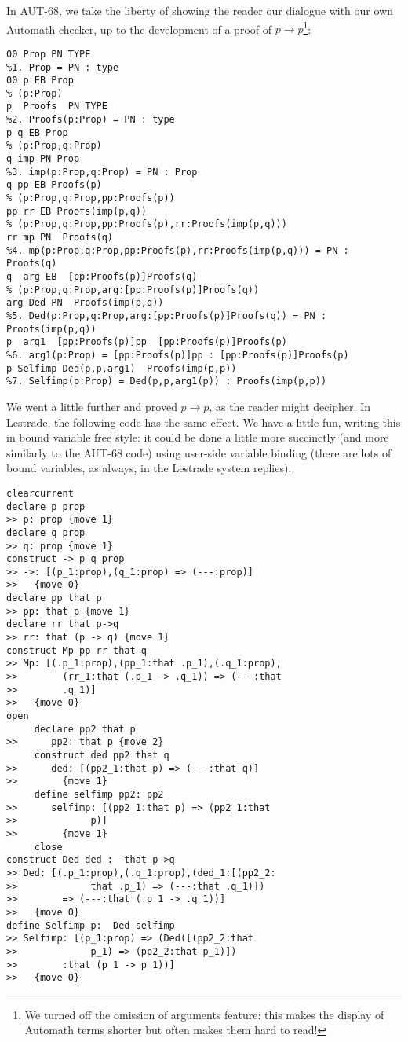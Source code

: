 \documentclass[submission,copyright,creativecommons]{eptcs}
\begin{document}
In AUT-68, we take the liberty of showing the reader our dialogue with our own Automath checker, up to the development of a proof of $p\rightarrow p$\footnote{We turned off the omission of arguments feature:  this makes the display of Automath terms shorter but often makes them hard to read!}:

   \begin{verbatim}
00 Prop PN TYPE
%1. Prop = PN : type
00 p EB Prop
% (p:Prop)
p  Proofs  PN TYPE
%2. Proofs(p:Prop) = PN : type
p q EB Prop
% (p:Prop,q:Prop)
q imp PN Prop
%3. imp(p:Prop,q:Prop) = PN : Prop
q pp EB Proofs(p)
% (p:Prop,q:Prop,pp:Proofs(p))
pp rr EB Proofs(imp(p,q))
% (p:Prop,q:Prop,pp:Proofs(p),rr:Proofs(imp(p,q)))
rr mp PN  Proofs(q)
%4. mp(p:Prop,q:Prop,pp:Proofs(p),rr:Proofs(imp(p,q))) = PN : Proofs(q)
q  arg EB  [pp:Proofs(p)]Proofs(q)
% (p:Prop,q:Prop,arg:[pp:Proofs(p)]Proofs(q))
arg Ded PN  Proofs(imp(p,q))
%5. Ded(p:Prop,q:Prop,arg:[pp:Proofs(p)]Proofs(q)) = PN : Proofs(imp(p,q))
p  arg1  [pp:Proofs(p)]pp  [pp:Proofs(p)]Proofs(p)
%6. arg1(p:Prop) = [pp:Proofs(p)]pp : [pp:Proofs(p)]Proofs(p)
p Selfimp Ded(p,p,arg1)  Proofs(imp(p,p))
%7. Selfimp(p:Prop) = Ded(p,p,arg1(p)) : Proofs(imp(p,p))
\end{verbatim}

We went a little further and proved $p \rightarrow p$, as the reader might decipher.  In Lestrade, the following code has the same effect.  We have a little fun, writing this in bound variable free style:  it could be done a little more succinctly (and more similarly to the AUT-68 code) using user-side variable binding (there are lots of bound variables, as always, in the Lestrade system replies).

\begin{verbatim}
clearcurrent
declare p prop
>> p: prop {move 1}
declare q prop
>> q: prop {move 1}
construct -> p q prop
>> ->: [(p_1:prop),(q_1:prop) => (---:prop)]
>>   {move 0}
declare pp that p
>> pp: that p {move 1}
declare rr that p->q
>> rr: that (p -> q) {move 1}
construct Mp pp rr that q
>> Mp: [(.p_1:prop),(pp_1:that .p_1),(.q_1:prop),
>>        (rr_1:that (.p_1 -> .q_1)) => (---:that 
>>        .q_1)]
>>   {move 0}
open
     declare pp2 that p
>>      pp2: that p {move 2}
     construct ded pp2 that q
>>      ded: [(pp2_1:that p) => (---:that q)]
>>        {move 1}
     define selfimp pp2: pp2
>>      selfimp: [(pp2_1:that p) => (pp2_1:that 
>>             p)]
>>        {move 1}
     close
construct Ded ded :  that p->q
>> Ded: [(.p_1:prop),(.q_1:prop),(ded_1:[(pp2_2:
>>             that .p_1) => (---:that .q_1)])
>>        => (---:that (.p_1 -> .q_1))]
>>   {move 0}
define Selfimp p:  Ded selfimp
>> Selfimp: [(p_1:prop) => (Ded([(pp2_2:that 
>>             p_1) => (pp2_2:that p_1)])
>>        :that (p_1 -> p_1))]
>>   {move 0}
\end{verbatim}
\end{document}
